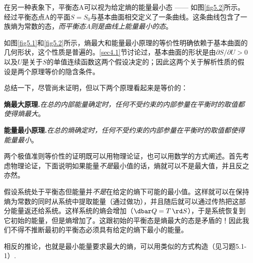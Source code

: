 在另一种表象下，平衡态A可以视为给定熵的能量最小态 —— 如图\ref{fig5.2}所示。经过平衡态点A的平面$S=S_0$与基本曲面相交定义了一条曲线。这条曲线包含了一族熵为常数的态，{\it 而平衡态A则是曲线上能量最小的态}。

如图\ref{fig5.1}和\ref{fig5.2}所示，熵最大和能量最小原理的等价性明确依赖于基本曲面的几何形状，这个性质是普遍的。\ref{sec4.1}节讨论过，基本曲面的形状是由$\partial S/\partial U>0$以及$U$是关于$S$的单值连续函数这两个假设决定的；因此这两个关于解析性质的假设是两个原理等价的隐含条件。

总结一下，尽管尚未证明，但以下两个原理看起来是等价的：

{\bf 熵最大原理.}{\it 在总的内部能量确定时，任何不受约束的内部参量在平衡时的取值都使得熵最大}。

{\bf 能量最小原理.}{\it 在总的熵确定时，任何不受约束的内部参量在平衡时的取值都使得能量最小}。

两个极值准则等价性的证明既可以用物理论证，也可以用数学的方式阐述。首先考虑物理论证，下面说明如果能量{\it 不是}最小值的话，熵就可以不是最大值，并且反之亦然。

假设系统处于平衡态但能量并{\it 不是}在给定的熵下可能的最小值。这样就可以在保持熵为常数的同时从系统中提取能量（通过做功），并且随后就可以通过传热把这部分能量返还给系统。这样系统的熵会增加（$\dbar Q=T\, \rd S$），于是系统恢复到它初始的能量，但是熵增加了。这跟初始的平衡态是熵最大的态是矛盾的！因此我们不得不推断最初的平衡态必须具有给定的熵下最小的能量。

相反的推论，也就是最小能量要求最大的熵，可以用类似的方式构造（见习题5.1-1）.

